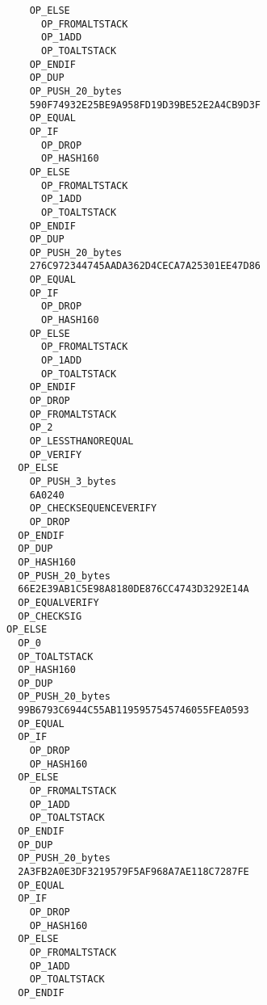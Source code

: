 \begin{lstlisting}
                       OP_ELSE
                         OP_FROMALTSTACK
                         OP_1ADD
                         OP_TOALTSTACK
                       OP_ENDIF
                       OP_DUP
                       OP_PUSH_20_bytes
                       590F74932E25BE9A958FD19D39BE52E2A4CB9D3F
                       OP_EQUAL
                       OP_IF
                         OP_DROP
                         OP_HASH160
                       OP_ELSE
                         OP_FROMALTSTACK
                         OP_1ADD
                         OP_TOALTSTACK
                       OP_ENDIF
                       OP_DUP
                       OP_PUSH_20_bytes
                       276C972344745AADA362D4CECA7A25301EE47D86
                       OP_EQUAL
                       OP_IF
                         OP_DROP
                         OP_HASH160
                       OP_ELSE
                         OP_FROMALTSTACK
                         OP_1ADD
                         OP_TOALTSTACK
                       OP_ENDIF
                       OP_DROP
                       OP_FROMALTSTACK
                       OP_2
                       OP_LESSTHANOREQUAL
                       OP_VERIFY
                     OP_ELSE
                       OP_PUSH_3_bytes
                       6A0240
                       OP_CHECKSEQUENCEVERIFY
                       OP_DROP
                     OP_ENDIF
                     OP_DUP
                     OP_HASH160
                     OP_PUSH_20_bytes
                     66E2E39AB1C5E98A8180DE876CC4743D3292E14A
                     OP_EQUALVERIFY
                     OP_CHECKSIG
                   OP_ELSE
                     OP_0
                     OP_TOALTSTACK
                     OP_HASH160
                     OP_DUP
                     OP_PUSH_20_bytes
                     99B6793C6944C55AB1195957545746055FEA0593
                     OP_EQUAL
                     OP_IF
                       OP_DROP
                       OP_HASH160
                     OP_ELSE
                       OP_FROMALTSTACK
                       OP_1ADD
                       OP_TOALTSTACK
                     OP_ENDIF
                     OP_DUP
                     OP_PUSH_20_bytes
                     2A3FB2A0E3DF3219579F5AF968A7AE118C7287FE
                     OP_EQUAL
                     OP_IF
                       OP_DROP
                       OP_HASH160
                     OP_ELSE
                       OP_FROMALTSTACK
                       OP_1ADD
                       OP_TOALTSTACK
                     OP_ENDIF

\end{lstlisting}
